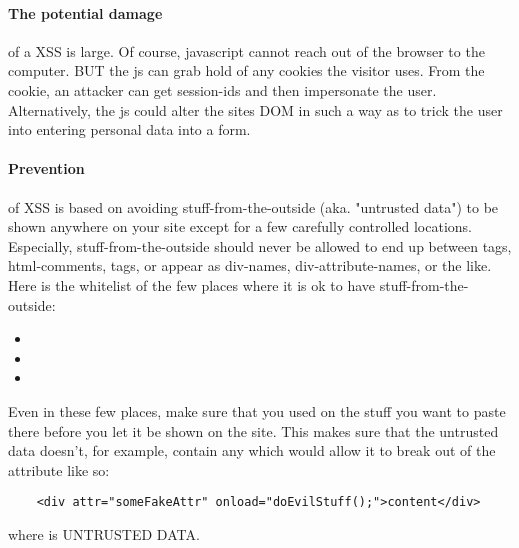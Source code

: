 \paragraph{The potential damage} of a XSS is large. Of course, javascript cannot reach out of the browser to the computer. BUT the js can grab hold of any cookies the visitor uses. From the cookie, an attacker can get session-ids and then impersonate the user. Alternatively, the js could alter the sites DOM in such a way as to trick the user into entering personal data into a form. 

\paragraph{Prevention} of XSS is based on avoiding stuff-from-the-outside (aka. "untrusted data") to be shown anywhere on your site except for a few carefully controlled locations. Especially, stuff-from-the-outside should never be allowed to end up between  tags,  html-comments,  tags, or appear as div-names, div-attribute-names, or the like. Here is the whitelist of the few places where it is ok to have stuff-from-the-outside:
\begin{itemize}
    \item {} 
    \item {} 
    \item {}
\end{itemize}
Even in these few places, make sure that you used  on the stuff you want to paste there before you let it be shown on the site. This makes sure that the untrusted data doesn't, for example, contain any  which would allow it to break out of the attribute like so: 
\begin{lstlisting}
    <div attr="someFakeAttr" onload="doEvilStuff();">content</div>
\end{lstlisting}
where  is UNTRUSTED DATA.
